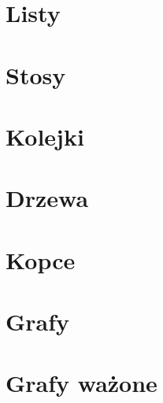 \documentclass[a5paper, 4pt]{article}
\begin{document}
    

    \section{Listy}
    

    \section{Stosy}
    

    \section{Kolejki}
    

    \section{Drzewa}
    

    \section{Kopce}
    

    \section{Grafy}
    

    \section{Grafy ważone}
    

    \newpage
    ~
\end{document}
